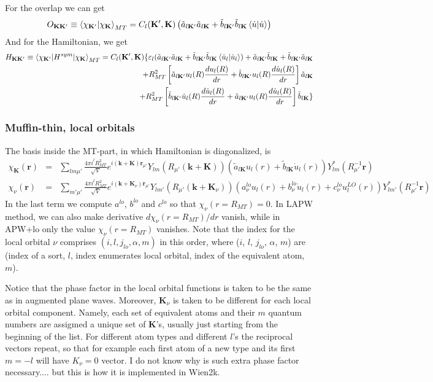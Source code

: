\documentclass[aps,prb,floatfix,epsfig,singlecolumn,showpacs,preprintnumbers]{revtex4}
\renewcommand{\vr}{{\mathbf{r}}}
\newcommand{\vk}{{\mathbf{k}}}
\newcommand{\vK}{{\mathbf{K}}}
\begin{document}
For the overlap we can get
\begin{eqnarray}
O_{\vK\vK'}\equiv \braket{\chi_{\vK'}|\chi_\vK}_{MT}=C_l(\vK',\vK) 
\left(\tilde{a}_{l\vK'} \tilde{a}_{l\vK}  +\tilde{b}_{l\vK'}\tilde{b}_{l\vK} \braket{\dot{u}|\dot{u}}\right)
\end{eqnarray}
And for the Hamiltonian, we get
\begin{eqnarray}
H_{\vK\vK'}\equiv\braket{\chi_{\vK'}|H^{sym}|\chi_\vK}_{MT}=
C_l(\vK',\vK) 
\{
\varepsilon_l (\tilde{a}_{l\vK'}\tilde{a}_{l\vK}+\tilde{b}_{l\vK'}\tilde{b}_{l\vK} \braket{\dot{u}_l|\dot{u}_l})+
\tilde{a}_{l\vK'}\tilde{b}_{l\vK}+\tilde{b}_{l\vK'}\tilde{a}_{l\vK}
\nonumber\\
+R_{MT}^2 
\left[\tilde{a}_{l\vK'} u_l(R) \frac{d u_l(R)}{dr}+\tilde{b}_{l\vK'} u_l(R) \frac{d\dot{u}_l(R)}{dr}\right]\tilde{a}_{l\vK}
\nonumber\\
+R_{MT}^2 
\left[\tilde{b}_{l\vK'}\dot{u}_l(R) \frac{d\dot{u}_l(R)}{dr}+\tilde{a}_{l\vK'} u_l(R) \frac{d\dot{u}_l(R)}{dr}\right]\tilde{b}_{l\vK}  
\}
\end{eqnarray}


\subsubsection{Muffin-thin, local orbitals}

The basis inside the MT-part, in which Hamiltonian is diagonalized, is
\begin{eqnarray}
\chi_\vK(\vr) &=& \sum_{lm\mu'} \frac{4\pi i^l R_{MT}^2}{\sqrt{V}}e^{i(\vk+\vK)\vr_{\mu'}}Y_{lm}(R_{\mu'}(\vk+\vK))  
 (\tilde{a}_{l\vK} u_l(r) + \tilde{b}_{l\vK}  \dot{u}_l(r))Y^*_{lm}(R_{\mu'}^{-1}\vr)\\
\chi_{\nu}(\vr) &=& \sum_{m'\mu'}\frac{4\pi i^l  R_{MT}^2}{\sqrt{V}}e^{i(\vk+\vK_\nu)\vr_{\mu'}}Y_{lm'}(R_{\mu'}(\vk+\vK_\nu))  
 (a^{lo}_{\nu} u_l(r) + b^{lo}_{\nu}\dot{u}_l(r) + c^{lo}_{\nu} u^{LO}_l(r)) Y^*_{lm'}(R_{\mu'}^{-1}\vr)
\end{eqnarray}
In the last term we compute $a^{lo}$, $b^{lo}$ and $c^{lo}$ so that
$\chi_{\nu}(r=R_{MT}) =0$. In LAPW method, we can also make derivative $d\chi_\nu(r=R_{MT})/dr$
vanish, while in APW+lo only the value $\chi_\nu(r=R_{MT})$ vanishes.
Note that the index for the local orbital $\nu$ comprises
$(i,l,j_{lo},\alpha,m)$ in this order, where ($i$, $l$, $j_{lo}$, $\alpha$, $m$) are
(index of a sort, $l$, index enumerates local orbital, index of the
equivalent atom, $m$).

Notice that the phase factor in the local orbital functions is taken
to be the same as in augmented plane waves. Moreover, $\vK_\nu$ is
taken to be different for each local orbital component. Namely, each
set of equivalent atoms and their $m$ quantum numbers are assigmed a unique set
of $\vK$'s, usually just starting from the beginning of the
list. For different atom types and different $l$'s the reciprocal
vectors repeat, so that for example each first atom of a new type and
its first $m=-l$ will have $K_\nu=0$ vector. I do not know why is such
extra phase factor necessary.... but this is how it is implemented in Wien2k.
\end{document}

